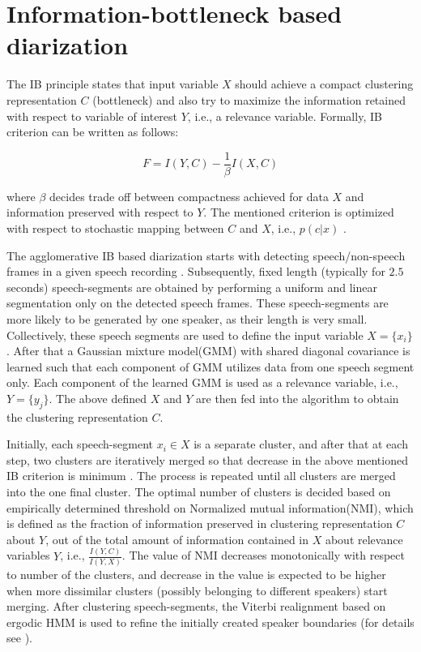 \documentclass[conference]{IEEEtran}
\begin{document}
\section{Information-bottleneck based diarization}
\label{system}


The IB principle states that input variable $X$ should achieve a compact clustering representation $C$ (bottleneck) and also try to maximize the information retained with respect to variable of interest $Y$, i.e., a relevance variable. Formally, IB criterion can be written as follows:

\begin{equation}
\label{eq:aIB}
F = I(Y,C) - \frac{1}{\beta}I(X,C) 
\end{equation} 

where $\beta$ decides trade off between compactness achieved for data $X$ and information preserved with respect to $Y$. The mentioned criterion is optimized with respect to stochastic mapping between $C$ and $X$, i.e., $p(c|x)$ . 

The agglomerative IB based diarization starts with detecting speech/non-speech frames in a given speech recording \cite{aIB2}. Subsequently, fixed length (typically for $2.5$ seconds) speech-segments are obtained by performing a uniform and linear segmentation only on the detected speech frames. These speech-segments are more likely to be generated by one speaker, as their length is very small. Collectively, these speech segments are used to define the input variable $X={\{x_i\}}$. After that a Gaussian mixture model(GMM) with shared diagonal covariance is learned such that each component of GMM utilizes data from one speech segment only. Each component of the learned GMM is used as a relevance variable, i.e., $Y = \{ y_{j}\}$. The above defined $X$ and $Y$ are then fed into the algorithm to obtain the clustering representation $C$. 

Initially, each speech-segment $x_i \in X$ is a separate cluster, and after that at each step, two clusters are iteratively merged so that decrease in the above mentioned IB criterion is minimum \cite{aIB2}. The process is repeated until all clusters are merged into the one final cluster. The optimal number of clusters is decided based on empirically determined threshold on Normalized mutual information(NMI), which is defined as the fraction of information preserved in clustering representation $C$ about $Y$, out of the total amount of information contained in $X$ about relevance variables $Y$, i.e., $\frac{I(Y,C)}{I(Y,X)}$. The value of NMI decreases monotonically with respect to number of the clusters, and decrease in the value is expected to be higher when more dissimilar clusters (possibly belonging to different speakers) start merging.  After clustering speech-segments, the Viterbi realignment based on ergodic HMM is used to refine the initially created speaker boundaries (for details see \cite{aIB2}).
\end{document}
